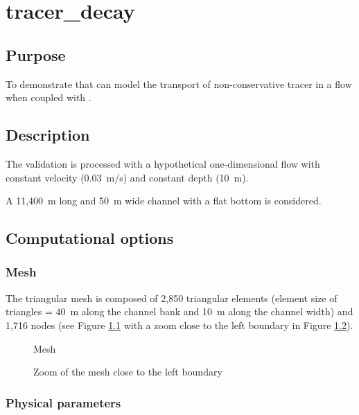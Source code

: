 \chapter{tracer\_decay}

\section{Purpose}

To demonstrate that  can model the transport of non-conservative
tracer in a flow when coupled with \waqtel.

\section{Description}
The validation is processed with a hypothetical one-dimensional flow with
constant velocity (0.03~m/s) and constant depth (10~m).

A 11,400~m long and 50~m wide channel with a flat bottom is considered.
%
\section{Computational options}
%
\subsection{Mesh}
%
The triangular mesh is composed of 2,850 triangular elements (element size
of triangles = 40~m along the channel bank and 10~m along the channel width)
and 1,716 nodes (see Figure \ref{fig:tracer_decay:mesh} with a zoom close to
the left boundary in Figure \ref{fig:tracer_decay:mesh_zoomed}).

\begin{figure}[H]
\centering
\caption{Mesh}\label{fig:tracer_decay:mesh}
\end{figure}

\begin{figure}[H]
\centering
\caption{Zoom of the mesh close to the left boundary}\label{fig:tracer_decay:mesh_zoomed}
\end{figure}

\subsection{Physical parameters}

